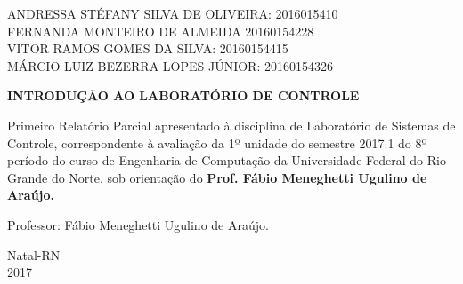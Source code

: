 \documentclass[a4paper,12pt]{article}
\begin{document}
\newpage


\thispagestyle{empty}

\begin{center}
\begin{normalsize}
ANDRESSA STÉFANY SILVA DE OLIVEIRA: 2016015410\\
\vspace{0.8cm}
FERNANDA MONTEIRO DE ALMEIDA 20160154228\\
\vspace{0.8cm}
VITOR RAMOS GOMES DA SILVA: 20160154415\\
\vspace{0.8cm}
MÁRCIO LUIZ BEZERRA LOPES JÚNIOR: 20160154326\\

\end{normalsize}
\end{center}
\vspace{3cm}

{\bf{\large {\centering INTRODUÇÃO AO LABORATÓRIO DE CONTROLE\\}}}

\vspace{4cm}

\begin{adjustwidth}{7.5cm}{0cm}

{\normalsize

Primeiro Relatório Parcial apresentado à disciplina de
Laboratório de Sistemas de Controle, correspondente à
avaliação da 1º unidade do semestre 2017.1 do 8º período
do curso de Engenharia de Computação da
Universidade Federal do Rio Grande do Norte, sob
orientação do {\bf Prof. Fábio Meneghetti Ugulino de
Araújo.}

}

\end{adjustwidth}

\vspace{2cm}

\begin{center}

Professor:  Fábio Meneghetti Ugulino de Araújo.

\vspace{2.5cm}

{\large Natal-RN\\
2017}

\end{center}

\newpage

\end{document}
